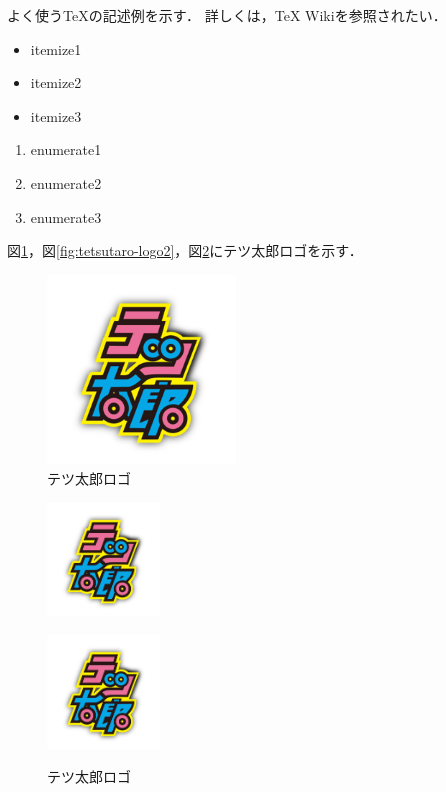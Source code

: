 よく使うTeXの記述例を示す．
詳しくは，TeX Wiki\cite{TeXWiki}を参照されたい．

\begin{itemize}
    \item itemize1
    \item itemize2
    \item itemize3
\end{itemize}

\begin{enumerate}
    \item enumerate1
    \item enumerate2
    \item enumerate3
\end{enumerate}

図\ref{fig:tetsutaro-logo1}，図\ref{fig:tetsutaro-logo2}，図\ref{fig:tetsutaro-logo3}にテツ太郎ロゴを示す．

\begin{figure}[tb]
    \centering
    \includegraphics[clip,width=5cm]{assets/introduction/tetsutaro-logo.png}
    \caption{テツ太郎ロゴ}
    \label{fig:tetsutaro-logo1}
\end{figure}


\begin{figure}[tb]
    \begin{minipage}[b]{0.45\linewidth}
        \centering
        \includegraphics[width=30mm]{assets/introduction/tetsutaro-logo.png}
        \label{fig:tetsutaro-logo2}
    \end{minipage}
    \begin{minipage}[b]{0.45\linewidth}
        \centering
        \includegraphics[width=30mm]{assets/introduction/tetsutaro-logo.png}
        \label{fig:tetsutaro-logo3}
    \end{minipage}
    \caption{テツ太郎ロゴ}
\end{figure}

